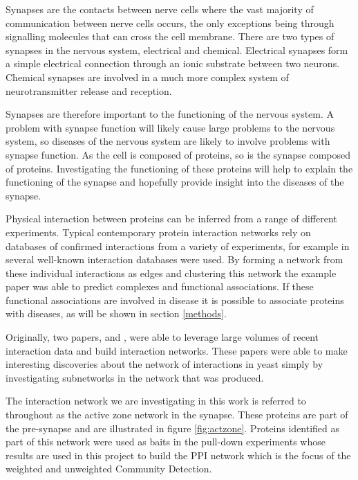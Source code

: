 Synapses are the contacts between nerve cells where the vast majority of communication between nerve cells occurs, the only exceptions being through signalling molecules that can cross the cell membrane.
There are two types of synapses in the nervous system, electrical and chemical\autocite{kandel_principles_2000}.
Electrical synapses form a simple electrical connection through an ionic substrate between two neurons.
Chemical synapses are involved in a much more complex system of neurotransmitter release and reception.

Synapses are therefore important to the functioning of the nervous system.
A problem with synapse function will likely cause large problems to the nervous system, so diseases of the nervous system are likely to involve problems with synapse function.
As the cell is composed of proteins, so is the synapse composed of proteins.
Investigating the functioning of these proteins will help to explain the functioning of the synapse and hopefully provide insight into the diseases of the synapse.

Physical interaction between proteins can be inferred from a range of different experiments.
Typical contemporary protein interaction networks rely on databases of confirmed interactions from a variety of experiments, for example in \textcite{kenley_detecting_2011} several well-known interaction databases were used.
By forming a network from these individual interactions as edges and clustering this network the example paper was able to predict complexes and functional associations.
If these functional associations are involved in disease it is possible to associate proteins with diseases, as will be shown in section \ref{methods}.

Originally, two papers, \textcite{ito_comprehensive_2001} and \textcite{uetz_comprehensive_2000}, were able to leverage large volumes of recent interaction data and build interaction networks.
These papers were able to make interesting discoveries about the network of interactions in yeast simply by investigating subnetworks in the network that was produced.

The interaction network we are investigating in this work is referred to throughout as the active zone network in the synapse.
These proteins are part of the pre-synapse and are illustrated in figure \ref{fig:actzone}.
Proteins identified as part of this network were used as baits in the pull-down experiments whose results are used in this project to build the PPI network which is the focus of the weighted and unweighted Community Detection.

